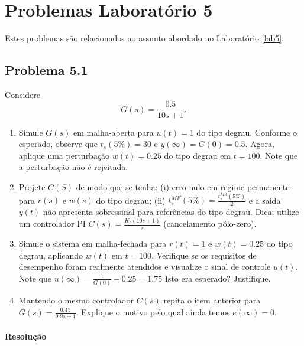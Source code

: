 \documentclass[
]{book}
\providecommand{\tightlist}{%
  \setlength{\itemsep}{0pt}\setlength{\parskip}{0pt}}
\theoremstyle{definition}
\theoremstyle{definition}
\theoremstyle{definition}
\theoremstyle{remark}
\begin{document}
\hypertarget{problemas-laboratuxf3rio-5}{%
\chapter*{Problemas Laboratório 5}\label{problemas-laboratuxf3rio-5}}

Estes problemas são relacionados ao assunto abordado no Laboratório \ref{lab5}.

\hypertarget{problema-5.1}{%
\section*{Problema 5.1}\label{problema-5.1}}

Considere
\[
G(s) = \frac {0.5}{10s+1}.
\]

\begin{enumerate}
\def\labelenumi{(\alph{enumi})}
\tightlist
\item
  Simule \(G(s)\) em malha-aberta para \(u(t) = 1\) do tipo degrau. Conforme o esperado, observe que \(t_s(5\%) = 30\) e \(y(\infty) = G(0) = 0.5\). Agora, aplique uma perturbação \(w(t) = 0.25\) do tipo degrau em \(t=100\). Note que a perturbação não é rejeitada.
\item
  Projete \(C(S)\) de modo que se tenha: (i) erro nulo em regime permanente para \(r(s)\) e \(w(s)\) do tipo degrau; (ii) \(t_s^{MF}(5\%) = \frac {t_s^{MA}(5\%)}{2}\) e a saída \(y(t)\) não apresenta sobressinal para referências do tipo degrau. Dica: utilize um controlador PI \(C(s) = \frac{K_c(10s+1)}{s}\) (cancelamento pólo-zero).
\item
  Simule o sistema em malha-fechada para \(r(t) =1\) e \(w(t) = 0.25\) do tipo degrau, aplicando \(w(t)\) em \(t=100\). Verifique se os requisitos de desempenho foram realmente atendidos e visualize o sinal de controle \(u(t)\). Note que \(u(\infty) = \frac {1}{G(0)}-0.25 = 1.75\) Isto era esperado? Justifique.
\item
  Mantendo o mesmo controlador \(C(s)\) repita o item anterior para \(G(s) = \frac {0.45}{9.9s+1}\). Explique o motivo pelo qual ainda temos \(e(\infty) = 0\).
\end{enumerate}

\hypertarget{resoluuxe7uxe3o-12}{%
\subsubsection*{Resolução}\label{resoluuxe7uxe3o-12}}
\end{document}
